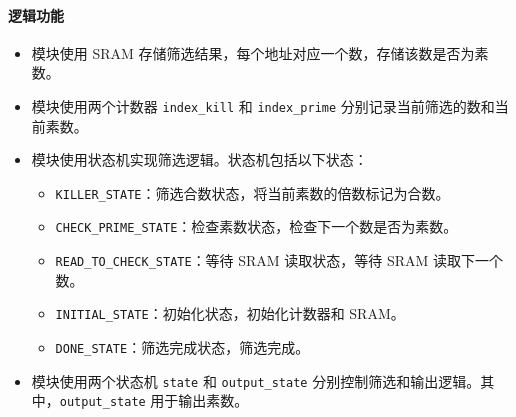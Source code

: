 \documentclass[a4paper]{article}
\begin{document}
\paragraph{逻辑功能}
\begin{itemize}
    \item 模块使用 SRAM 存储筛选结果，每个地址对应一个数，存储该数是否为素数。
    \item 模块使用两个计数器 \texttt{index\_kill} 和 \texttt{index\_prime} 分别记录当前筛选的数和当前素数。
    \item 模块使用状态机实现筛选逻辑。状态机包括以下状态：
     \begin{itemize}
        \item \texttt{KILLER\_STATE}：筛选合数状态，将当前素数的倍数标记为合数。
        \item \texttt{CHECK\_PRIME\_STATE}：检查素数状态，检查下一个数是否为素数。
        \item \texttt{READ\_TO\_CHECK\_STATE}：等待 SRAM 读取状态，等待 SRAM 读取下一个数。
        \item \texttt{INITIAL\_STATE}：初始化状态，初始化计数器和 SRAM。
        \item \texttt{DONE\_STATE}：筛选完成状态，筛选完成。
     \end{itemize}
    \item 模块使用两个状态机 \texttt{state} 和 \texttt{output\_state} 分别控制筛选和输出逻辑。其中，\texttt{output\_state} 用于输出素数。
\end{itemize}
\end{document}
